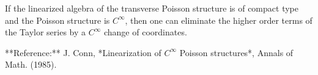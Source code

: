 If the linearized algebra of the transverse Poisson structure is of compact type and the Poisson structure is $C^\infty$, then one can eliminate the higher order terms of the Taylor series by a $C^\infty$ change of coordinates.

**Reference:** J. Conn, *Linearization of $C^\infty$ Poisson structures*, Annals of Math. (1985).
